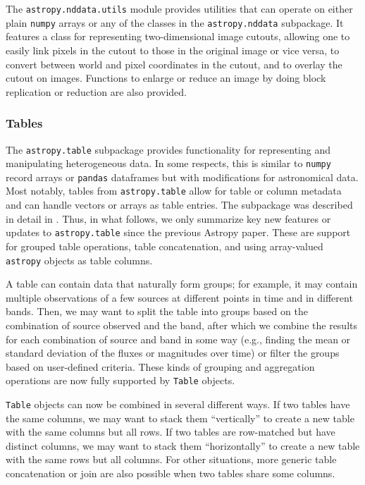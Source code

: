 \documentclass[modern]{aastex61}
\newcommand{\package}[1]{\texttt{#1}\xspace}
\newcommand{\astropy}{Astropy\xspace}
\begin{document}
The \package{astropy.nddata.utils} module provides utilities that can operate
on either plain \package{numpy} arrays or any of the classes in the
\package{astropy.nddata} subpackage. It features a class for representing
two-dimensional image cutouts, allowing one to easily link pixels in the cutout
to those in the original image or vice versa, to convert
between world and pixel coordinates in the cutout, and to overlay the cutout
on images. Functions to enlarge or reduce an image by doing block replication
or reduction are also provided.

\subsubsection{Tables}
\label{sec:table}

The \package{astropy.table} subpackage provides functionality for
representing and manipulating heterogeneous data. In some respects,
this is similar to \package{numpy} record arrays \citep{numpy} or
\package{pandas} dataframes \citep{pandas} but with modifications for
astronomical data. Most notably, tables from \package{astropy.table}
allow for table or column metadata and can handle
vectors or arrays as table entries.
The subpackage was described in
detail in \cite{astropy}.  Thus, in what follows, we only summarize
key new features or updates to \package{astropy.table} since the
previous \astropy paper. These are support for grouped table
operations, table concatenation, and using array-valued
\package{astropy} objects as table columns.


A table can contain data that naturally form groups; for example, it may
contain multiple observations of a few sources at different points in time
and in different bands. Then, we may want to split the table into groups based
on the combination of source observed and the band, after which we combine the
results for each combination of source and band in some way (e.g., finding
the mean or standard deviation of the fluxes or magnitudes over time) or filter
the groups based on user-defined criteria. These kinds of grouping and
aggregation operations are now fully supported by \texttt{Table} objects.


\texttt{Table} objects can now be combined in several different ways. If two
tables have the same columns, we may want to stack them ``vertically'' to create a
new table with the same columns but all rows. If two tables are row-matched but
have distinct columns, we may want to stack them ``horizontally'' to create a
new table with the same rows but all columns. For other situations, more generic
table concatenation or join are also possible when two tables share some
columns.
\end{document}
